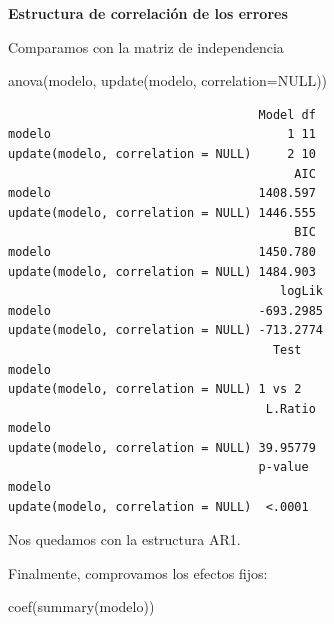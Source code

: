 \documentclass[
]{book}
\newenvironment{Shaded}{\begin{snugshade}}{\end{snugshade}}
\newcommand{\AttributeTok}[1]{\textcolor[rgb]{0.77,0.63,0.00}{#1}}
\newcommand{\ConstantTok}[1]{\textcolor[rgb]{0.00,0.00,0.00}{#1}}
\newcommand{\FunctionTok}[1]{\textcolor[rgb]{0.00,0.00,0.00}{#1}}
\newcommand{\NormalTok}[1]{#1}
\begin{document}
\textbf{Estructura de correlación de los errores}

Comparamos con la matriz de independencia

\begin{Shaded}
\begin{Highlighting}[]
\FunctionTok{anova}\NormalTok{(modelo, }\FunctionTok{update}\NormalTok{(modelo, }\AttributeTok{correlation=}\ConstantTok{NULL}\NormalTok{))}
\end{Highlighting}
\end{Shaded}

\begin{verbatim}
                                   Model df
modelo                                 1 11
update(modelo, correlation = NULL)     2 10
                                        AIC
modelo                             1408.597
update(modelo, correlation = NULL) 1446.555
                                        BIC
modelo                             1450.780
update(modelo, correlation = NULL) 1484.903
                                      logLik
modelo                             -693.2985
update(modelo, correlation = NULL) -713.2774
                                     Test
modelo                                   
update(modelo, correlation = NULL) 1 vs 2
                                    L.Ratio
modelo                                     
update(modelo, correlation = NULL) 39.95779
                                   p-value
modelo                                    
update(modelo, correlation = NULL)  <.0001
\end{verbatim}

Nos quedamos con la estructura AR1.

Finalmente, comprovamos los efectos fijos:

\begin{Shaded}
\begin{Highlighting}[]
\FunctionTok{coef}\NormalTok{(}\FunctionTok{summary}\NormalTok{(modelo))}
\end{Highlighting}
\end{Shaded}
\end{document}
